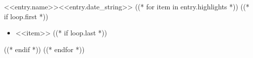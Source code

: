 \begin{cvpublicationsubsection}[1]{<<entry.name>>}{}{<<entry.date_string>>}
((* for item in entry.highlights *))
    ((* if loop.first *))
    \begin{itemize}
    ((* endif *))
        \item <<item>>
    ((* if loop.last *))
    \end{itemize}
    ((* endif *))
((* endfor *))
\end{cvpublicationsubsection}
